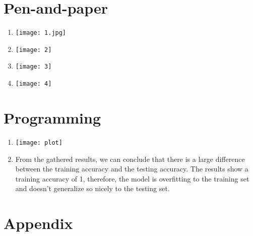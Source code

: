 \documentclass[12pt,a4paper]{article}
\begin{document}
\section{Pen-and-paper}
\begin{enumerate}
	\item
	      \hfill\texttt{[image: 1.jpg]}\hspace*{\fill}

	      \vspace{40px}

	\item
	      \hfill\texttt{[image: 2]}\hspace*{\fill}

	\item
	      \hfill\texttt{[image: 3]}\hspace*{\fill}

	      \vspace{20px}

	\item
	      \hfill\texttt{[image: 4]}\hspace*{\fill}

\end{enumerate}

\pagebreak

\section{Programming}
\begin{enumerate}
	\item
	      \begin{center}
	      	\hfill\texttt{[image: plot]}\hspace*{\fill}
	      \end{center}

	      \vspace{20px}

	\item
	      From the gathered results, we can conclude that there is a large
	      difference between the training accuracy and the testing accuracy.
	      The results show a training accuracy of 1, therefore, the model is
	      overfitting to the training set and doesn't generalize so nicely to
	      the testing set.

\end{enumerate}

\pagebreak

\section{Appendix}

\end{document}
